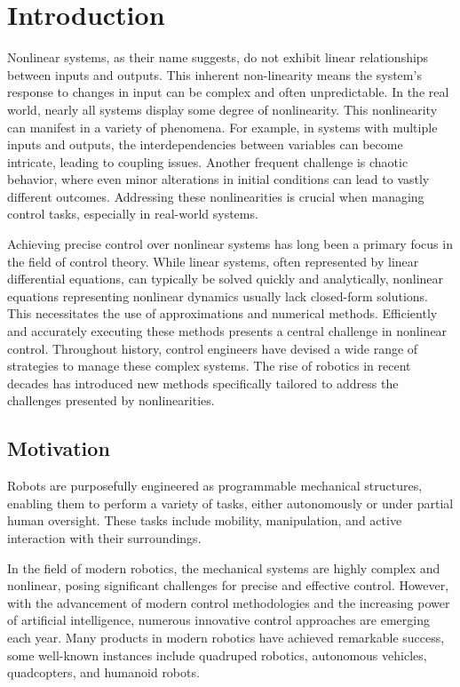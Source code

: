 \chapter{Introduction}
Nonlinear systems, as their name suggests, do not exhibit linear relationships between inputs and outputs. This inherent non-linearity means the system's response to changes in input can be complex and often unpredictable. In the real world, nearly all systems display some degree of nonlinearity. This nonlinearity can manifest in a variety of phenomena. For example, in systems with multiple inputs and outputs, the interdependencies between variables can become intricate, leading to coupling issues. Another frequent challenge is chaotic behavior, where even minor alterations in initial conditions can lead to vastly different outcomes. Addressing these nonlinearities is crucial when managing control tasks, especially in real-world systems.

Achieving precise control over nonlinear systems has long been a primary focus in the field of control theory. While linear systems, often represented by linear differential equations, can typically be solved quickly and analytically, nonlinear equations representing nonlinear dynamics usually lack closed-form solutions. This necessitates the use of approximations and numerical methods. Efficiently and accurately executing these methods presents a central challenge in nonlinear control. Throughout history, control engineers have devised a wide range of strategies to manage these complex systems. The rise of robotics in recent decades has introduced new methods specifically tailored to address the challenges presented by nonlinearities.

\section{Motivation}
Robots are purposefully engineered as programmable mechanical structures, enabling them to perform a variety of tasks, either autonomously or under partial human oversight. These tasks include mobility, manipulation, and active interaction with their surroundings.

In the field of modern robotics, the mechanical systems are highly complex and nonlinear, posing significant challenges for precise and effective control. However, with the advancement of modern control methodologies and the increasing power of artificial intelligence, numerous innovative control approaches are emerging each year. Many products in modern robotics have achieved remarkable success, some well-known instances include quadruped robotics\cite{biswal2021development}, autonomous vehicles\cite{schwarting2018planning}, quadcopters\cite{luukkonen2011modelling}, and humanoid robots\cite{saeedvand2019comprehensive}.

